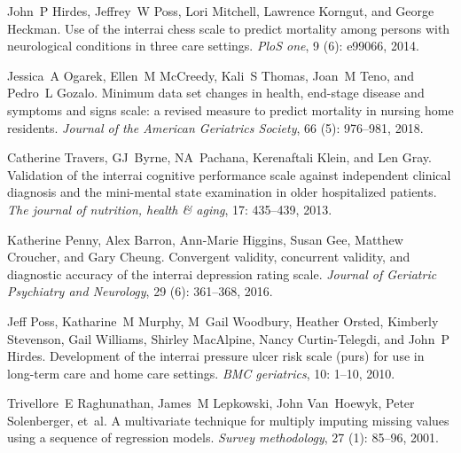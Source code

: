 \documentclass{article}
\begin{document}
\begin{thebibliography}{60}
John~P Hirdes, Jeffrey~W Poss, Lori Mitchell, Lawrence Korngut, and George
  Heckman.
\newblock Use of the interrai chess scale to predict mortality among persons
  with neurological conditions in three care settings.
\newblock \emph{PloS one}, 9 (6): e99066, 2014.

Jessica~A Ogarek, Ellen~M McCreedy, Kali~S Thomas, Joan~M Teno, and Pedro~L
  Gozalo.
\newblock Minimum data set changes in health, end-stage disease and symptoms
  and signs scale: a revised measure to predict mortality in nursing home
  residents.
\newblock \emph{Journal of the American Geriatrics Society}, 66
  (5): 976--981, 2018.

Catherine Travers, GJ~Byrne, NA~Pachana, Kerenaftali Klein, and Len Gray.
\newblock Validation of the interrai cognitive performance scale against
  independent clinical diagnosis and the mini-mental state examination in older
  hospitalized patients.
\newblock \emph{The journal of nutrition, health \& aging}, 17:
  435--439, 2013.

Katherine Penny, Alex Barron, Ann-Marie Higgins, Susan Gee, Matthew Croucher,
  and Gary Cheung.
\newblock Convergent validity, concurrent validity, and diagnostic accuracy of
  the interrai depression rating scale.
\newblock \emph{Journal of Geriatric Psychiatry and Neurology}, 29
  (6): 361--368, 2016.

Jeff Poss, Katharine~M Murphy, M~Gail Woodbury, Heather Orsted, Kimberly
  Stevenson, Gail Williams, Shirley MacAlpine, Nancy Curtin-Telegdi, and John~P
  Hirdes.
\newblock Development of the interrai pressure ulcer risk scale (purs) for use
  in long-term care and home care settings.
\newblock \emph{BMC geriatrics}, 10: 1--10, 2010.

Trivellore~E Raghunathan, James~M Lepkowski, John Van~Hoewyk, Peter
  Solenberger, et~al.
\newblock A multivariate technique for multiply imputing missing values using a
  sequence of regression models.
\newblock \emph{Survey methodology}, 27 (1): 85--96, 2001.


\end{thebibliography}
\end{document}
